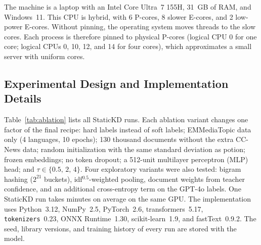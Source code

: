 The machine is a laptop with an Intel Core Ultra~7 155H, 31~GB of RAM, and Windows~11. This CPU is hybrid, with 6 P-cores, 8 slower E-cores, and 2 low-power E-cores. Without pinning, the operating system moves threads to the slow cores. Each process is therefore pinned to physical P-cores (logical CPU 0 for one core; logical CPUs 0, 10, 12, and 14 for four cores), which approximates a small server with uniform cores.

\subsection{Experimental Design and Implementation Details}
\label{sec:design}
Table~\ref{tab:ablation} lists all  StaticKD runs. Each ablation variant changes one factor of the final recipe: hard labels instead of soft labels; EMMediaTopic data only (4 languages, 10 epochs); 130 thousand documents without the extra CC-News data; random initialization with the same standard deviation as potion; frozen embeddings; no token dropout; a 512-unit multilayer perceptron (MLP) head; and $\tau\in\{0.5,\,2,\,4\}$. Four exploratory variants were also tested: bigram hashing ($2^{21}$ buckets), idf$^{0.5}$-weighted pooling, document weights from teacher confidence, and an additional cross-entropy term on the GPT-4o labels. One StaticKD run takes  minutes on average on the same GPU. The implementation uses Python~3.12, NumPy~2.5, PyTorch~2.6, transformers~5.17, \texttt{tokenizers}~0.23, ONNX Runtime~1.30, scikit-learn~1.9, and fastText~0.9.2. The seed, library versions, and training history of every run are stored with the model.
